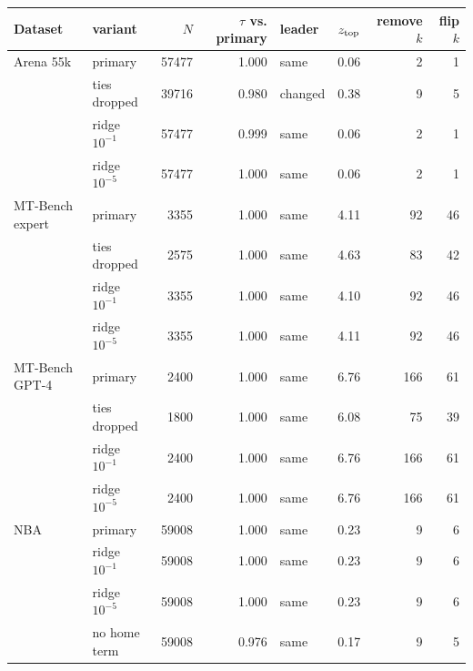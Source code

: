 {\scriptsize\setlength{\tabcolsep}{3pt}\begin{tabular}{@{}llrrlrrr@{}}\toprule
Dataset & variant & $N$ & $\tau$ vs. primary & leader & $z_{\rm top}$ & remove $k$ & flip $k$\\\midrule
Arena 55k & primary & 57477 & 1.000 & same & 0.06 & 2 & 1 \\
 & ties dropped & 39716 & 0.980 & changed & 0.38 & 9 & 5 \\
 & ridge $10^{-1}$ & 57477 & 0.999 & same & 0.06 & 2 & 1 \\
 & ridge $10^{-5}$ & 57477 & 1.000 & same & 0.06 & 2 & 1 \\
MT-Bench expert & primary & 3355 & 1.000 & same & 4.11 & 92 & 46 \\
 & ties dropped & 2575 & 1.000 & same & 4.63 & 83 & 42 \\
 & ridge $10^{-1}$ & 3355 & 1.000 & same & 4.10 & 92 & 46 \\
 & ridge $10^{-5}$ & 3355 & 1.000 & same & 4.11 & 92 & 46 \\
MT-Bench GPT-4 & primary & 2400 & 1.000 & same & 6.76 & 166 & 61 \\
 & ties dropped & 1800 & 1.000 & same & 6.08 & 75 & 39 \\
 & ridge $10^{-1}$ & 2400 & 1.000 & same & 6.76 & 166 & 61 \\
 & ridge $10^{-5}$ & 2400 & 1.000 & same & 6.76 & 166 & 61 \\
NBA & primary & 59008 & 1.000 & same & 0.23 & 9 & 6 \\
 & ridge $10^{-1}$ & 59008 & 1.000 & same & 0.23 & 9 & 6 \\
 & ridge $10^{-5}$ & 59008 & 1.000 & same & 0.23 & 9 & 6 \\
 & no home term & 59008 & 0.976 & same & 0.17 & 9 & 5 \\
\bottomrule\end{tabular}}
